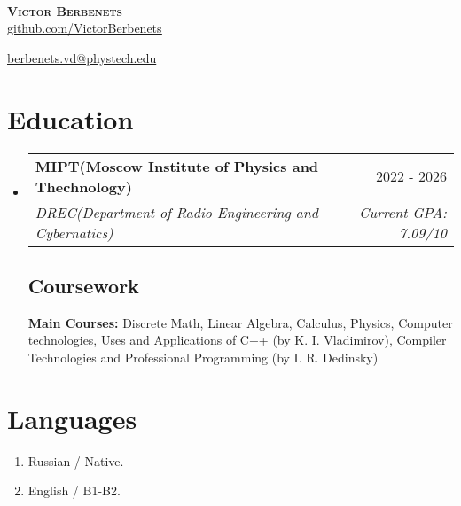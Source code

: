 \documentclass[letterpaper,11pt]{article}
\makeatletter
\newcommand{\resumeSubheading}[4]{
  \vspace{-2pt}\item
    \begin{tabular*}{0.97\textwidth}[t]{l@{\extracolsep{\fill}}r}
      \textbf{#1} & #2 \\
      \textit{\small#3} & \textit{\small #4} \\
    \end{tabular*}\vspace{-7pt}
}
\newcommand{\resumeSubHeadingListStart}{\begin{itemize}[leftmargin=0.15in, label={}]}
\newcommand{\resumeSubHeadingListEnd}{\end{itemize}}
\makeatother
\begin{document}
\
\vspace{+5pt}

\begin{center}
    \textbf{\Huge \scshape Victor Berbenets} \\ \vspace{8pt}
    \small 
    \href{https://github.com/VictorBerbenets}{\underline{github.com/VictorBerbenets}} $  $

    {\underline{berbenets.vd@phystech.edu}}
\end{center}

\section{Education}
  \resumeSubHeadingListStart
  
    \resumeSubheading
      {MIPT(Moscow Institute of Physics and Thechnology)}{2022 - 2026}
      {DREC(Department of Radio Engineering and Cybernatics)}{Current GPA: 7.09/10}
      

    \vspace{+10pt}

    \subsection{Coursework}
      \textbf{Main Courses:} Discrete Math, Linear Algebra, Calculus, Physics,
      Computer technologies, Uses and Applications of C++ (by K. I. Vladimirov),
      Compiler Technologies and Professional Programming (by I. R. Dedinsky)\\


  \resumeSubHeadingListEnd
\section{Languages}
 \begin{itemize}[leftmargin=0.15in, label={}]
    \begin{enumerate}
        \item Russian / Native.
        \item English / B1-B2.
    \end{enumerate}
 \end{itemize}
\end{document}
